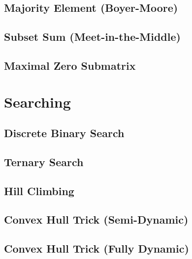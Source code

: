 \subsection{Majority Element (Boyer-Moore)}

\subsection{Subset Sum (Meet-in-the-Middle)}

\subsection{Maximal Zero Submatrix}


\section{Searching}
\setcounter{section}{3}
\setcounter{subsection}{0}
\subsection{Discrete Binary Search}

\subsection{Ternary Search}

\subsection{Hill Climbing}

\subsection{Convex Hull Trick (Semi-Dynamic)}

\subsection{Convex Hull Trick (Fully Dynamic)}


